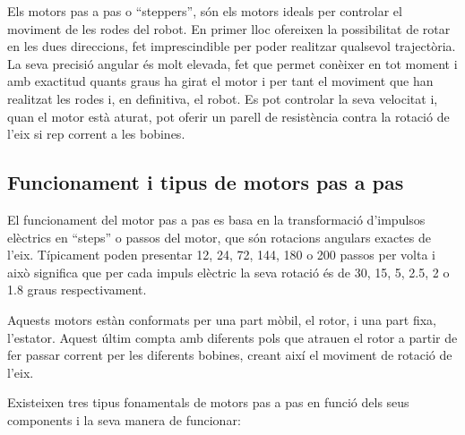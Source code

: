 Els motors pas a pas o “steppers”, són els motors ideals per controlar el moviment de les rodes del robot. En primer lloc ofereixen la possibilitat de rotar en les dues direccions, fet imprescindible per poder realitzar qualsevol trajectòria. La seva precisió angular és molt elevada, fet que permet conèixer en tot moment i amb exactitud quants graus ha girat el motor i per tant el moviment que han realitzat les rodes i, en definitiva, el robot. Es pot controlar la seva velocitat i, quan el motor està aturat, pot oferir un parell de resistència contra la rotació de l'eix si rep corrent a les bobines. 


\subsection{Funcionament i tipus de motors pas a pas}
El funcionament del motor pas a pas es basa en la transformació d'impulsos elèctrics en “steps” o passos del motor, que són rotacions angulars exactes de l'eix. Típicament poden presentar 12, 24, 72, 144, 180 o 200 passos per volta i això significa que per cada impuls elèctric la seva rotació és de 30, 15, 5, 2.5, 2 o 1.8 graus respectivament. 

Aquests motors estàn conformats per una part mòbil, el rotor, i una part fixa, l'estator. Aquest últim compta amb diferents pols que atrauen el rotor a partir de fer passar corrent per les diferents bobines, creant així el moviment de rotació de l'eix.

Existeixen tres tipus fonamentals de motors pas a pas en funció dels seus components i la seva manera de funcionar:

